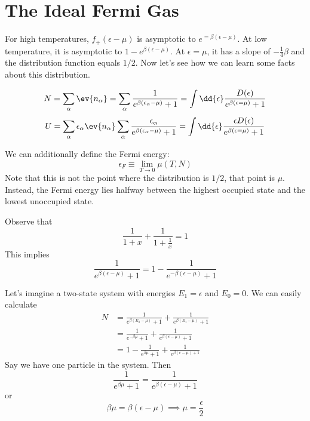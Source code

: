 \documentclass[a4paper,twoside,master.tex]{subfiles}
\begin{document}

\section{The Ideal Fermi Gas}
\label{sec:the_ideal_fermi_gas}

For high temperatures, $ f_+(\epsilon - \mu) $ is asymptotic to $ e^{= \beta (\epsilon - \mu)} $. At low temperature, it is asymptotic to $ 1 - e^{\beta (\epsilon - \mu)} $. At $ \epsilon = \mu $, it has a slope of $ - \frac{1}{4} \beta $ and the distribution function equals $ 1/2 $. Now let's see how we can learn some facts about this distribution.

\begin{equation}
    N = \sum_{\alpha} \ev{n_{\alpha}} = \sum_{\alpha} \frac{1}{e^{\beta (\epsilon_{\alpha} - \mu)} + 1} = \int \dd{\epsilon} \frac{D(\epsilon)}{e^{\beta (\epsilon = \mu)} + 1}
\end{equation}
\begin{equation}
    U = \sum_{\alpha} \epsilon_{\alpha} \ev{n_{\alpha}} \sum_{\alpha} \frac{\epsilon_{\alpha}}{e^{\beta (\epsilon_{\alpha} - \mu)} + 1} = \int \dd{\epsilon} \frac{\epsilon D(\epsilon)}{e^{\beta (\epsilon = \mu)} + 1}
\end{equation}

We can additionally define the Fermi energy:
\begin{equation}
    \epsilon_{F} \equiv \lim_{T \to 0} \mu(T,N)
\end{equation}
Note that this is not the point where the distribution is $ 1/2 $, that point is $ \mu $. Instead, the Fermi energy lies halfway between the highest occupied state and the lowest unoccupied state.

Observe that
\begin{equation}
    \frac{1}{1+x} + \frac{1}{1 + \frac{1}{x}} = 1
\end{equation}
This implies
\begin{equation}
    \frac{1}{e^{\beta (\epsilon - \mu)} + 1} = 1 - \frac{1}{e^{- \beta (\epsilon - \mu)} + 1}
\end{equation}

Let's imagine a two-state system with energies $ E_1 = \epsilon $ and $ E_0 = 0 $. We can easily calculate
\begin{align}
    N &= \frac{1}{e^{\beta (E_0 - \mu)} + 1} + \frac{1}{e^{\beta (E_1 - \mu)} + 1}\\
    &= \frac{1}{e^{- \beta \mu} + 1} + \frac{1}{e^{\beta (\epsilon - \mu)} + 1} \\
    &= 1 - \frac{1}{e^{\beta \mu} + 1} + \frac{1}{e^{\beta(\epsilon - \mu) + 1}}
\end{align}
Say we have one particle in the system. Then
\begin{equation}
    \frac{1}{e^{\beta \mu} + 1} = \frac{1}{e^{\beta (\epsilon - \mu)} + 1}
\end{equation}
or
\begin{equation}
    \beta \mu = \beta (\epsilon - \mu) \implies \mu = \frac{\epsilon}{2}
\end{equation}
\end{document}
